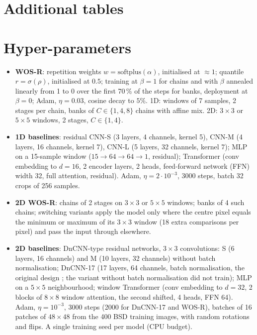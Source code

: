 \documentclass[11pt,a4paper]{article}
\theoremstyle{definition}
\theoremstyle{remark}
\begin{document}
\section{Additional tables}\label{app:tables}


\section{Hyper-parameters}\label{app:hyper}
\begin{itemize}
\item \textbf{WOS-R}: repetition weights $w=\mathrm{softplus}(\alpha)$, initialised at $\approx1$; quantile $r=\sigma(\rho)$, initialised at $0.5$;
  training at $\beta=1$ for chains and with $\beta$ annealed linearly from 1 to 0 over the first 70\,\% of the steps for banks,
  deployment at $\beta=0$; Adam, $\eta=0.03$, cosine decay to $5\%$.
  1D: windows of 7 samples, 2 stages per chain, banks of $C\in\{1,4,8\}$ chains with affine mix.
  2D: $3{\times}3$ or $5{\times}5$ windows, 2 stages, $C\in\{1,4\}$.
\item \textbf{1D baselines}: residual CNN-S (3 layers, 4 channels, kernel 5), CNN-M (4 layers, 16 channels, kernel 7),
  CNN-L (5 layers, 32 channels, kernel 7); MLP on a 15-sample window ($15{\to}64{\to}64{\to}1$, residual);
  Transformer (conv embedding to $d{=}16$, 2 encoder layers, 2 heads, feed-forward network (FFN) width 32, full attention, residual).
  Adam, $\eta=2\cdot10^{-3}$, 3000 steps, batch 32 crops of 256 samples.
\item \textbf{2D WOS-R}: chains of 2 stages on $3{\times}3$ or $5{\times}5$ windows; banks of 4 such chains; switching
  variants apply the model only where the centre pixel equals the minimum or maximum of its $3{\times}3$ window (18
  extra comparisons per pixel) and pass the input through elsewhere.
\item \textbf{2D baselines}: DnCNN-type residual networks, $3{\times}3$ convolutions: S (6 layers, 16 channels) and
  M (10 layers, 32 channels) without batch normalisation; DnCNN-17 (17 layers, 64 channels, batch normalisation, the
  original design \cite{zhang2017dncnn}; the variant without batch normalisation did not train); MLP on a $5{\times}5$ neighbourhood; window Transformer (conv embedding to $d{=}32$,
  2 blocks of $8{\times}8$ window attention, the second shifted, 4 heads, FFN 64). Adam, $\eta=10^{-3}$, 3000 steps
  (2000 for DnCNN-17 and WOS-R), batches of 16 patches of $48{\times}48$ from the 400 BSD training images, with
  random rotations and flips. A single training seed per model (CPU budget).

\end{itemize}
\end{document}
